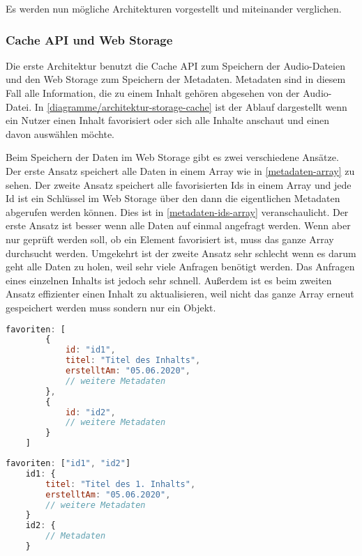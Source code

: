 Es werden nun mögliche Architekturen vorgestellt und miteinander verglichen. 

\subsubsection{Cache API und Web Storage}
Die erste Architektur benutzt die Cache \ac{API} zum Speichern der Audio-Dateien und den Web Storage zum Speichern der Metadaten. Metadaten sind in diesem Fall alle Information, die zu einem Inhalt gehören abgesehen von der Audio-Datei. In \autoref{diagramme/architektur-storage-cache} ist der Ablauf dargestellt wenn ein Nutzer einen Inhalt favorisiert oder sich alle Inhalte anschaut und einen davon auswählen möchte. 


Beim Speichern der Daten im Web Storage gibt es zwei verschiedene Ansätze. Der erste Ansatz speichert alle Daten in einem Array wie in \autoref{metadaten-array} zu sehen. Der zweite Ansatz speichert alle favorisierten Ids in einem Array und jede Id ist ein Schlüssel im Web Storage über den dann die eigentlichen Metadaten abgerufen werden können. Dies ist in \autoref{metadaten-ids-array} veranschaulicht.
Der erste Ansatz ist besser wenn alle Daten auf einmal angefragt werden. Wenn aber nur geprüft werden soll, ob ein Element favorisiert ist, muss das ganze Array durchsucht werden. Umgekehrt ist der zweite Ansatz sehr schlecht wenn es darum geht alle Daten zu holen, weil sehr viele Anfragen benötigt werden. Das Anfragen eines einzelnen Inhalts ist jedoch sehr schnell. Außerdem ist es beim zweiten Ansatz effizienter einen Inhalt zu aktualisieren, weil nicht das ganze Array erneut gespeichert werden muss sondern nur ein Objekt.

\clearpage

\begin{lstlisting}[language=JavaScript,caption={Speichern der Metadaten in einem Array},label={metadaten-array}]
    favoriten: [
    	{
    		id: "id1",
    		titel: "Titel des Inhalts",
    		erstelltAm: "05.06.2020",
    		// weitere Metadaten
    	},
    	{
    		id: "id2",
    		// weitere Metadaten
    	}
    ]
\end{lstlisting}

\begin{lstlisting}[language=JavaScript,caption={Speichern der Ids in einem Array},label={metadaten-ids-array}]
    favoriten: ["id1", "id2"]
    id1: {
    	titel: "Titel des 1. Inhalts",
    	erstelltAm: "05.06.2020",
    	// weitere Metadaten
    }
    id2: { 
    	// Metadaten
    }
\end{lstlisting}

